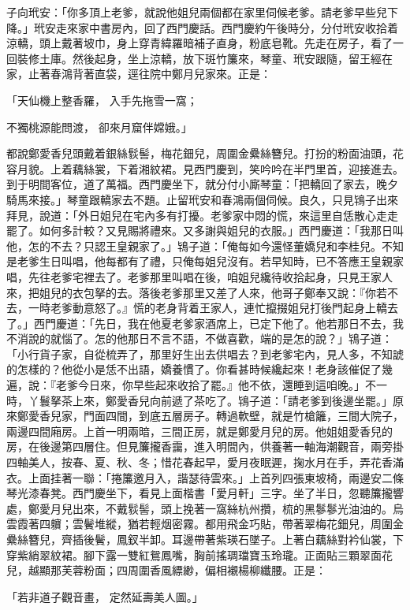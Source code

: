子向玳安：「你多頂上老爹，就說他姐兒兩個都在家里伺候老爹。請老爹早些兒下降。」玳安走來家中書房內，回了西門慶話。西門慶約午後時分，分付玳安收拾着涼轎，頭上戴著坡巾，身上穿青緯羅暗補子直身，粉底皂靴。先走在房子，看了一回裝修土庫。然後起身，坐上涼轎，放下斑竹簾來，琴童、玳安跟隨，留王經在家，止著春鴻背著直袋，逕往院中鄭月兒家來。正是：

「天仙機上整香羅，  入手先拖雪一窩；

不獨桃源能問渡，  卻來月窟伴嫦娥。」

都說鄭愛香兒頭戴着銀絲䯼髻，梅花鈿兒，周圍金纍絲簪兒。打扮的粉面油頭，花容月貌。上着藕絲裳，下着湘紋裙。見西門慶到，笑吟吟在半門里首，迎接進去。到于明間客位，道了萬福。西門慶坐下，就分付小廝琴童：「把轎回了家去，晚夕騎馬來接。」琴童跟轎家去不題。止留玳安和春鴻兩個伺候。良久，只見鴇子出來拜見，說道：「外日姐兒在宅內多有打擾。老爹家中悶的慌，來這里自恁散心走走罷了。如何多計較？又見賜將禮來。又多謝與姐兒的衣服。」西門慶道：「我那日叫他，怎的不去？只認王皇親家了。」鴇子道：「俺每如今還怪董嬌兒和李桂兒。不知是老爹生日叫唱，他每都有了禮，只俺每姐兒沒有。若早知時，已不答應王皇親家唱，先往老爹宅裡去了。老爹那里叫唱在後，咱姐兒纔待收拾起身，只見王家人來，把姐兒的衣包拏的去。落後老爹那里又差了人來，他哥子鄭奉又說：『你若不去，一時老爹動意怒了。』慌的老身背着王家人，連忙攛掇姐兒打後門起身上轎去了。」西門慶道：「先日，我在他夏老爹家酒席上，已定下他了。他若那日不去，我不消說的就惱了。怎的他那日不言不語，不做喜歡，端的是怎的說？」鴇子道：「小行貨子家，自從梳弄了，那里好生出去供唱去？到老爹宅內，見人多，不知諕的怎樣的？他從小是恁不出語，嬌養慣了。你看甚時候纔起來！老身該催促了幾遍，說：『老爹今日來，你早些起來收拾了罷。』他不依，還睡到這咱晚。」不一時，丫鬟拏茶上來，鄭愛香兒向前遞了茶吃了。鴇子道：「請老爹到後邊坐罷。」原來鄭愛香兒家，門面四間，到底五層房子。轉過軟壁，就是竹槍籬，三間大院子，兩邊四間廂房。上首一明兩暗，三間正房，就是鄭愛月兒的房。他姐姐愛香兒的房，在後邊第四層住。但見簾攏香靄，進入明間內，供養著一軸海潮觀音，兩旁掛四軸美人，按春、夏、秋、冬；惜花春起早，愛月夜眠遲，掬水月在手，弄花香滿衣。上面挂著一聯：「捲簾邀月入，諧瑟待雲來。」上首列四張東坡椅，兩邊安二條琴光漆春凳。西門慶坐下，看見上面楷書「愛月軒」三字。坐了半日，忽聽簾攏響處，鄭愛月兒出來，不戴䯼髻，頭上挽著一窩絲杭州攢，梳的黑鬖鬖光油油的。烏雲霞著四軉；雲鬢堆縱，猶若輕烟密霧。都用飛金巧貼，帶著翠梅花鈿兒，周圍金纍絲簪兒，齊插後鬢，鳳釵半卸。耳邊帶著紫瑛石墜子。上著白藕絲對衿仙裳，下穿紫綃翠紋裙。腳下露一雙紅鴛鳳嘴，胸前搖琱璫寶玉玲瓏。正面貼三顆翠面花兒，越顯那芙蓉粉面；四周圍香風縹緲，偏相襯楊柳纖腰。正是：

「若非道子觀音畫，  定然延壽美人圖。」

